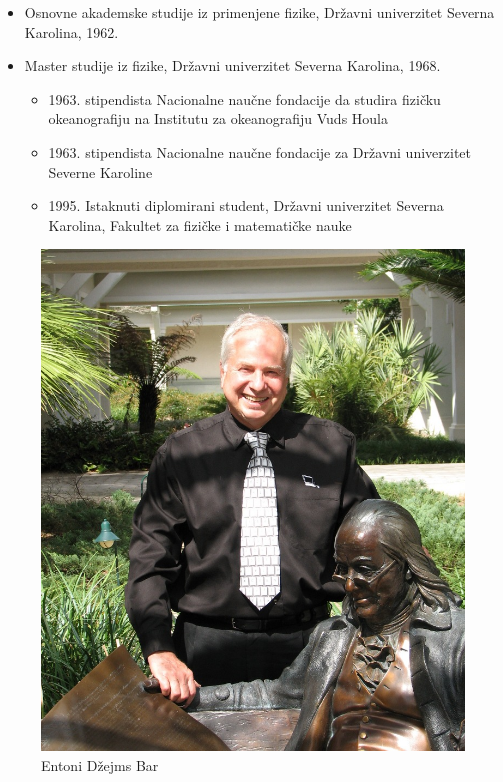\documentclass[a4paper]{article}
\begin{document}
{		\begin{itemize}
			\item Osnovne akademske studije iz primenjene fizike, Državni univerzitet Severna Karolina, 1962.
			\item Master studije iz fizike, Državni univerzitet Severna Karolina, 1968.
			\begin{itemize}
				\item 1963. stipendista Nacionalne naučne fondacije da studira fizičku okeanografiju na Institutu za okeanografiju Vuds Houla
				\item 1963. stipendista Nacionalne naučne fondacije za Državni univerzitet Severne Karoline
				\item 1995. Istaknuti diplomirani student, Državni univerzitet Severna Karolina, Fakultet za fizičke i matematičke nauke
			\end{itemize}
		\end{itemize}
		
		
		\begin{figure}[h!]
			\begin{center}
				\includegraphics[scale=0.7]{TonyBarr.jpg}
			\end{center}
			\caption{Entoni Džejms Bar}
		\end{figure}
		

}
\end{document}
